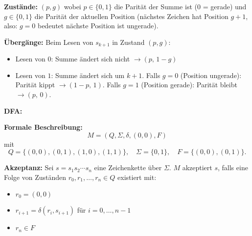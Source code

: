 \documentclass[a4paper,12pt]{article}
\begin{document}
\textbf{Zustände:} $(p, g)$ wobei $p \in \{0,1\}$ die Parität der Summe ist ($0$ = gerade) und $g \in \{0,1\}$ die Parität der aktuellen Position (nächstes Zeichen hat Position $g+1$, also: $g=0$ bedeutet nächste Position ist ungerade).

\textbf{Übergänge:} Beim Lesen von $s_{k+1}$ in Zustand $(p,g)$:
\begin{itemize}
    \item Lesen von $0$: Summe ändert sich nicht $\to (p,\, 1-g)$
    \item Lesen von $1$: Summe ändert sich um $k+1$. Falls $g=0$ (Position ungerade): Parität kippt $\to (1-p,\, 1)$. Falls $g=1$ (Position gerade): Parität bleibt $\to (p,\, 0)$.
\end{itemize}

\textbf{DFA:}

\begin{flushleft}
\end{flushleft}

\textbf{Formale Beschreibung:}
\[
M = (Q,\Sigma,\delta,(0,0),F)
\]
mit
\[
Q=\{(0,0),(0,1),(1,0),(1,1)\}, \quad \Sigma=\{0,1\}, \quad F=\{(0,0),(0,1)\}.
\]

\textbf{Akzeptanz:}
Sei $s = s_1s_2\cdots s_n$ eine Zeichenkette über $\Sigma$.
$M$ akzeptiert $s$, falls eine Folge von Zuständen $r_0,r_1,\ldots,r_n \in Q$ existiert mit:
\begin{itemize}
    \item $r_0 = (0,0)$
    \item $r_{i+1} = \delta(r_i,s_{i+1})$ für $i = 0,\ldots,n-1$
    \item $r_n \in F$
\end{itemize}
\end{document}
